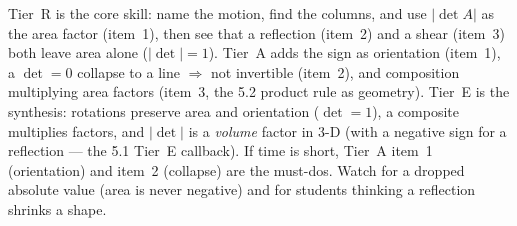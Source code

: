 \documentclass[10pt]{article}
\begin{document}
\begin{teachernote}
Tier~R is the core skill: name the motion, find the columns, and use $|\det A|$ as the area factor
(item~1), then see that a reflection (item~2) and a shear (item~3) both leave area alone ($|\det|=1$).
Tier~A adds the sign as orientation (item~1), a $\det=0$ collapse to a line $\Rightarrow$ not invertible
(item~2), and composition multiplying area factors (item~3, the 5.2 product rule as geometry). Tier~E is
the synthesis: rotations preserve area and orientation ($\det=1$), a composite multiplies factors, and
$|\det|$ is a \emph{volume} factor in 3-D (with a negative sign for a reflection --- the 5.1 Tier~E
callback). If time is short, Tier~A item~1 (orientation) and item~2 (collapse) are the must-dos. Watch
for a dropped absolute value (area is never negative) and for students thinking a reflection shrinks a
shape.
\end{teachernote}
\end{document}

